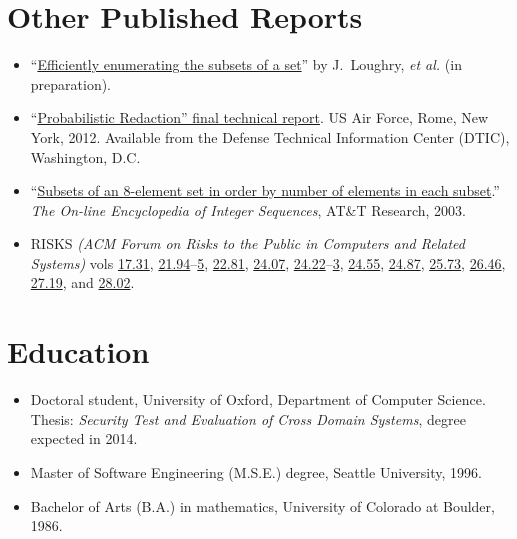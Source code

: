 \documentclass[12pt,twoside,letterpaper]{article}
\begin{document}
\vspace{-8mm}
\section*{Other Published Reports}
\vspace{-2mm}
\begin{itemize}
	\item ``\href{http://www.applied-math.org/subset.pdf}{Efficiently
		enumerating the subsets of a set}'' by J.\ Loughry, {\it et al.}
		(in preparation).

	\item ``\href{http://applied-math.org/Loughry2011.pdf}{Probabilistic
		Redaction'' final technical report}. US Air Force, Rome, New York, 2012.
		Available from the Defense Technical Information Center (DTIC),
		Washington, D.C.

	\item ``\href{http://oeis.org/A047869}{Subsets of an 8-element set
		in order by number of elements in each subset}.'' \emph{The On-line
		Encyclopedia of Integer Sequences}, AT\&T Research, 2003.

    \item RISKS \emph{(ACM Forum on Risks to the Public in Computers
    and Related Systems)} vols
	\href{http://catless.ncl.ac.uk/Risks/17.31.html}{17.31},
	\href{http://catless.ncl.ac.uk/Risks/21.94.html}{21.94}--\href{http://catless.ncl.ac.uk/Risks/21.95.html}{5},
	\href{http://catless.ncl.ac.uk/Risks/21.81.html}{22.81},
	\href{http://catless.ncl.ac.uk/Risks/24.07.html}{24.07},
    \href{http://catless.ncl.ac.uk/Risks/24.22.html}{24.22}--\href{http://catless.ncl.ac.uk/Risks/24.23.html}{3},
	\href{http://catless.ncl.ac.uk/Risks/24.55.html}{24.55},
	\href{http://catless.ncl.ac.uk/Risks/24.87.html}{24.87},
	\href{http://catless.ncl.ac.uk/Risks/25.73.html}{25.73},
	\href{http://catless.ncl.ac.uk/Risks/26.46.html}{26.46},
	\href{http://catless.ncl.ac.uk/Risks/27.19.html}{27.19},
	and \href{http://catless.ncl.ac.uk/Risks/28.02.html}{28.02}.
\end{itemize}

\vspace{-8mm}
\section*{Education}
\vspace{-2mm}
\begin{itemize}
    \item Doctoral student, University of Oxford, Department of
		Computer Science.  Thesis: \emph{Security Test and
		Evaluation of Cross Domain Systems}, degree expected in 2014.
    \item Master of Software Engineering (M.S.E.) degree, Seattle University, 1996.
    \item Bachelor of Arts (B.A.) in mathematics, University of Colorado at Boulder, 1986.
\end{itemize}
\end{document}
